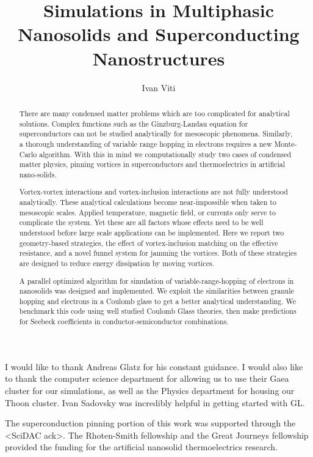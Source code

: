 \documentclass[12pt]{niuthesis}
\begin{document}
\title{Simulations in Multiphasic Nanosolids and Superconducting Nanostructures}

\author{Ivan Viti}


\begin{abstract}
There are many condensed matter problems which are too complicated for analytical solutions. Complex functions such as the Ginzburg-Landau equation for superconductors can not be studied analytically for mesoscopic phenomena. Similarly, a thorough understanding of variable range hopping in electrons requires a new Monte-Carlo algorithm. With this in mind we computationally study two cases of condensed matter physics, pinning vortices in superconductors and thermoelectrics in artificial nano-solids.

        Vortex-vortex interactions and vortex-inclusion interactions are not fully understood analytically. These analytical calculations become near-impossible when taken to mesoscopic scales. Applied temperature, magnetic field, or currents only serve to complicate the system. Yet these are all factors whose effects need to be well understood before large scale applications can be implemented. Here we report two geometry-based strategies, the effect of vortex-inclusion matching on the effective resistance, and a novel funnel system for jamming the vortices. Both of these strategies are designed to reduce energy dissipation by moving vortices. 

	A parallel optimized algorithm for simulation of variable-range-hopping of electrons in nanosolids was designed and implemented. We exploit the similarities between granule hopping and electrons in a Coulomb glass to get a better analytical understanding. We benchmark this code using well studied Coulomb Glass theories, then make predictions for Seebeck coefficients in conductor-semiconductor combinations.


\end{abstract}

\begin{acknowledgments}
  I would like to thank Andreas Glatz for his constant guidance. I would also like to thank the computer science department for allowing us to use their Gaea cluster for our simulations, as well as the Physics department for housing our Thoon cluster. Ivan Sadovsky was incredibly helpful in getting started with GL.
  
  The superconduction pinning portion of this work was supported through the <SciDAC ack>. The Rhoten-Smith fellowship and the Great Journeys fellowship provided the funding for the artificial nanosolid thermoelectrics research. 
\end{acknowledgments}
\end{document}
